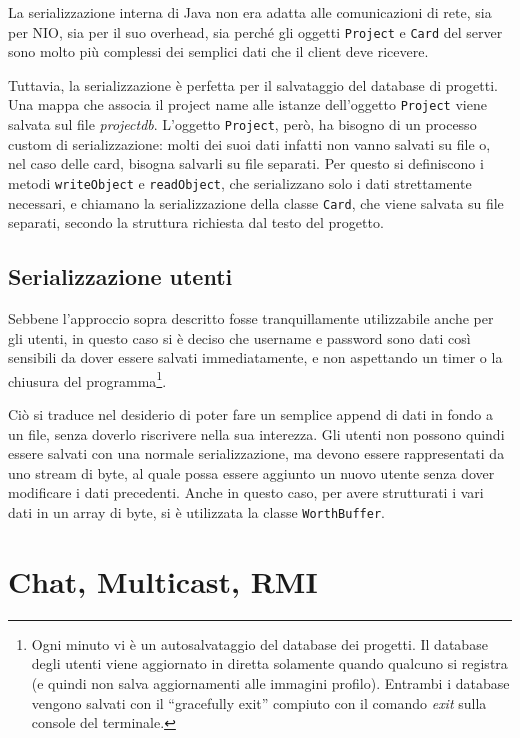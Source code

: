 \documentclass[a4paper,11pt] {article}
\begin{document}
La serializzazione interna di Java non era adatta alle comunicazioni di rete, sia per NIO, sia per il suo overhead, sia perché gli oggetti \texttt{Project} e \texttt{Card} del server sono molto più complessi dei semplici dati che il client deve ricevere.

Tuttavia, la serializzazione è perfetta per il salvataggio del database di progetti. Una mappa che associa il project name alle istanze dell'oggetto \texttt{Project} viene salvata sul file \textit{projectdb}. L'oggetto \texttt{Project}, però, ha bisogno di un processo custom di serializzazione: molti dei suoi dati infatti non vanno salvati su file o, nel caso delle card, bisogna salvarli su file separati. Per questo si definiscono i metodi \texttt{writeObject} e \texttt{readObject}, che serializzano solo i dati strettamente necessari, e chiamano la serializzazione della classe \texttt{Card}, che viene salvata su file separati, secondo la struttura richiesta dal testo del progetto.

\subsection*{Serializzazione utenti}

Sebbene l'approccio sopra descritto fosse tranquillamente utilizzabile anche per gli utenti, in questo caso si è deciso che username e password sono dati così sensibili da dover essere salvati immediatamente, e non aspettando un timer o la chiusura del programma\footnote{Ogni minuto vi è un autosalvataggio del database dei progetti. Il database degli utenti viene aggiornato in diretta solamente quando qualcuno si registra (e quindi non salva aggiornamenti alle immagini profilo). Entrambi i database vengono salvati con il ``gracefully exit'' compiuto con il comando \textit{exit} sulla console del terminale.}.

Ciò si traduce nel desiderio di poter fare un semplice append di dati in fondo a un file, senza doverlo riscrivere nella sua interezza. Gli utenti non possono quindi essere salvati con una normale serializzazione, ma devono essere rappresentati da uno stream di byte, al quale possa essere aggiunto un nuovo utente senza dover modificare i dati precedenti. Anche in questo caso, per avere strutturati i vari dati in un array di byte, si è utilizzata la classe \texttt{WorthBuffer}.

\section*{Chat, Multicast, RMI}
\end{document}
